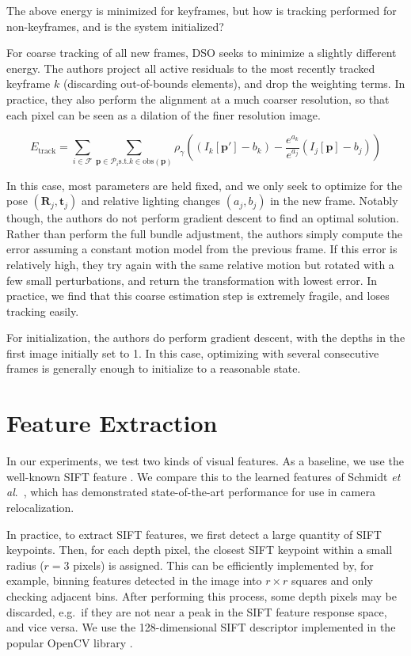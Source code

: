 The above energy is minimized for keyframes, but how is tracking performed for non-keyframes, and is the system initialized?

For coarse tracking of all new frames, DSO seeks to minimize a slightly different energy. The authors project all active residuals to the most recently tracked keyframe $k$ (discarding out-of-bounds elements), and drop the weighting terms. In practice, they also perform the alignment at a much coarser resolution, so that each pixel can be seen as a dilation of the finer resolution image.

\begin{equation}
E_{\text{track}} = \sum_{i \in \mathcal{F}} \sum_{\boldsymbol{p} \in \mathcal{P}_i \text{s.t.} k \in \text{obs}(\boldsymbol{p})} \rho_\gamma((I_k[\boldsymbol{p}'] - b_k) - \frac{e^{a_k}}{e^{a_j}}(I_j[\boldsymbol{p}] - b_j))
\end{equation}

In this case, most parameters are held fixed, and we only seek to optimize for the pose $(\boldsymbol{R}_j, \boldsymbol{t}_j)$ and relative lighting changes $(a_j, b_j)$ in the new frame. Notably though, the authors do not perform gradient descent to find an optimal solution. Rather than perform the full bundle adjustment, the authors simply compute the error assuming a constant motion model from the previous frame. If this error is relatively high, they try again with the same relative motion but rotated with a few small perturbations, and return the transformation with lowest error. In practice, we find that this coarse estimation step is extremely fragile, and loses tracking easily.

For initialization, the authors do perform gradient descent, with the depths in the first image initially set to 1. In this case, optimizing with several consecutive frames is generally enough to initialize to a reasonable state.

\section{Feature Extraction}
In our experiments, we test two kinds of visual features. As a baseline, we use the well-known SIFT feature \cite{lowe1999object}. We compare this to the learned features of Schmidt \textit{et al}.\ \cite{schmidt2017self}, which has demonstrated state-of-the-art performance for use in camera relocalization.

In practice, to extract SIFT features, we first detect a large quantity of SIFT keypoints. Then, for each depth pixel, the closest SIFT keypoint within a small radius ($r=3$ pixels) is assigned. This can be efficiently implemented by, for example, binning features detected in the image into $r \times r$ squares and only checking adjacent bins. After performing this process, some depth pixels may be discarded, e.g.\ if they are not near a peak in the SIFT feature response space, and vice versa. We use the 128-dimensional SIFT descriptor implemented in the popular OpenCV library \cite{opencv_library}.

